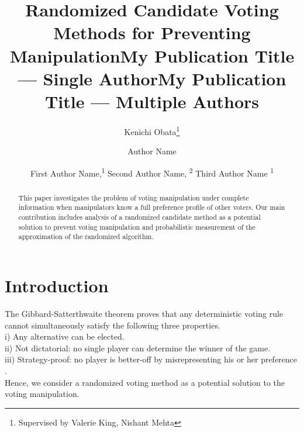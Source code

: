 \documentclass[letterpaper]{article} %
\title{Randomized Candidate Voting Methods for Preventing Manipulation}
\author{
    Kenichi Obata\thanks{Supervised by Valerie King, Nishant Mehta}
    \\
}
\title{My Publication Title --- Single Author}
\author {
    Author Name \\
}
\title{My Publication Title --- Multiple Authors}
\author {

        First Author Name,\textsuperscript{\rm 1}
        Second Author Name, \textsuperscript{\rm 2}
        Third Author Name \textsuperscript{\rm 1} \\
}
\begin{document}
\maketitle

\begin{abstract}
This paper investigates the problem of voting manipulation under complete information when manipulators know a full preference profile of other voters. Our main contribution includes analysis of a randomized candidate method as a potential solution to prevent voting manipulation and probabilistic measurement of the approximation of the randomized algorithm.
\end{abstract}

\section{Introduction}
The Gibbard-Satterthwaite theorem proves that any deterministic voting rule cannot simultaneously satisfy the following three properties.\\
i) Any alternative can be elected. \\
ii) Not dictatorial: no single player can determine the winner of the game. \\
iii) Strategy-proof: no player is better-off by misrepresenting his or her preference \cite{Satterthwaite}.\\
Hence, we consider a randomized voting method as a potential solution to the voting manipulation.
\end{document}
